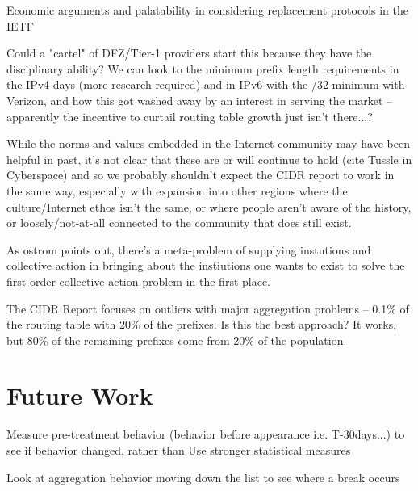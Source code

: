 Economic arguments and palatability in considering replacement protocols in the IETF

Could a "cartel" of DFZ/Tier-1 providers start this because they have the disciplinary ability? We can look to the minimum prefix length requirements in the IPv4 days (more research required) and in IPv6 with the /32 minimum with Verizon, and how this got washed away by an interest in serving the market -- apparently the incentive to curtail routing table growth just isn't there...?

While the norms and values embedded in the Internet community may have been helpful in past, it's not clear that these are or will continue to hold (cite Tussle in Cyberspace) and so we probably shouldn't expect the CIDR report to work in the same way, especially with expansion into other regions where the culture/Internet ethos isn't the same, or where people aren't aware of the history, or loosely/not-at-all connected to the community that does still exist.

As ostrom points out, there's a meta-problem of supplying instutions and collective action in bringing about the instiutions one wants to exist to solve the first-order collective action problem in the first place.

The CIDR Report focuses on outliers with major aggregation problems -- 0.1\% of the routing table with 20\% of the prefixes. Is this the best approach? It works, but 80\% of the remaining prefixes come from 20\% of the population.

\section{Future Work}
Measure pre-treatment behavior (behavior before appearance i.e. T-30days...) to see if behavior changed, rather than
Use stronger statistical measures

Look at aggregation behavior moving down the list to see where a break occurs
